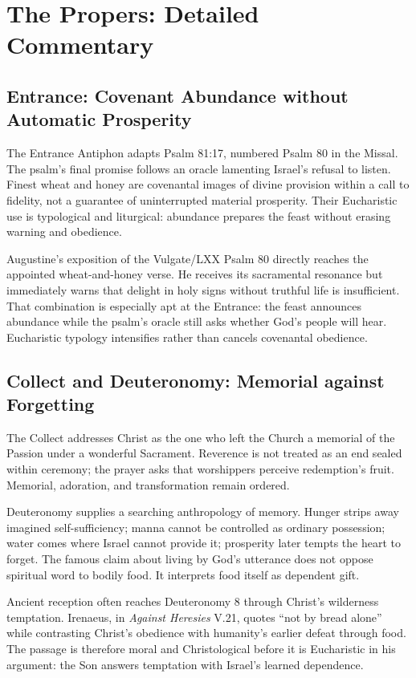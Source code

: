 \section*{The Propers: Detailed Commentary}

\subsection*{Entrance: Covenant Abundance without Automatic Prosperity\enspace{}}

The Entrance Antiphon adapts Psalm 81:17, numbered Psalm 80 in the Missal. The psalm's final promise follows an oracle lamenting Israel's refusal to listen. Finest wheat and honey are covenantal images of divine provision within a call to fidelity, not a guarantee of uninterrupted material prosperity. Their Eucharistic use is typological and liturgical: abundance prepares the feast without erasing warning and obedience.

Augustine's exposition of the Vulgate/LXX Psalm 80 directly reaches the appointed wheat-and-honey verse. He receives its sacramental resonance but immediately warns that delight in holy signs without truthful life is insufficient. That combination is especially apt at the Entrance: the feast announces abundance while the psalm's oracle still asks whether God's people will hear. Eucharistic typology intensifies rather than cancels covenantal obedience.

\subsection*{Collect and Deuteronomy: Memorial against Forgetting\enspace{}}

The Collect addresses Christ as the one who left the Church a memorial of the Passion under a wonderful Sacrament. Reverence is not treated as an end sealed within ceremony; the prayer asks that worshippers perceive redemption's fruit. Memorial, adoration, and transformation remain ordered.

Deuteronomy supplies a searching anthropology of memory. Hunger strips away imagined self-sufficiency; manna cannot be controlled as ordinary possession; water comes where Israel cannot provide it; prosperity later tempts the heart to forget. The famous claim about living by God's utterance does not oppose spiritual word to bodily food. It interprets food itself as dependent gift.

Ancient reception often reaches Deuteronomy 8 through Christ's wilderness temptation. Irenaeus, in \emph{Against Heresies} V.21, quotes “not by bread alone” while contrasting Christ's obedience with humanity's earlier defeat through food. The passage is therefore moral and Christological before it is Eucharistic in his argument: the Son answers temptation with Israel's learned dependence.

